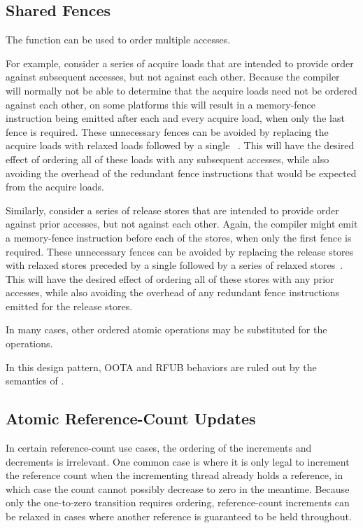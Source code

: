 \documentclass[10]{article}
\begin{document}
\subsection{Shared Fences}
\label{sec:Shared Fences}

The  function can be used to order multiple
accesses.

For example, consider a series of acquire loads that are intended to provide
order against subsequent accesses, but not against each other.
Because the compiler will normally not be able to determine that the
acquire loads need not be ordered against each other, on some platforms
this will result in a memory-fence instruction being emitted after each
and every acquire load, when only the last fence is required.
These unnecessary fences can be avoided by replacing the acquire
loads with relaxed loads followed by a single
~\cite[Section 4.1]{RaulSilvera2007WeakMemoryModel}.
This will have the desired effect of ordering all of these loads with any
subsequent accesses, while also avoiding the overhead of the redundant
fence instructions that would be expected from the acquire loads.

Similarly, consider a series of release stores that are intended to provide
order against prior accesses, but not against each other.
Again, the compiler might emit a memory-fence instruction before
each of the stores, when only the first fence is required.
These unnecessary fences can be avoided by replacing the release
stores with relaxed stores preceded by a single
 followed by
a series of relaxed stores~\cite[Section 4.2]{RaulSilvera2007WeakMemoryModel}.
This will have the desired effect of ordering all of these stores with any
prior accesses, while also avoiding the overhead of any redundant
fence instructions emitted for the release stores.

In many cases, other ordered atomic operations may be substituted for
the  operations.

In this design pattern, OOTA and RFUB behaviors are ruled out by the semantics
of .

\subsection{Atomic Reference-Count Updates}
\label{sec:Atomic Reference-Count Updates}

In certain reference-count use cases, the ordering of the increments and
decrements is irrelevant.
One common case is where it is only legal to increment the reference
count when the incrementing thread already holds a reference, in which
case the count cannot possibly decrease to zero in the meantime.
Because only the one-to-zero transition requires ordering, reference-count
increments can be relaxed in cases where another reference is guaranteed
to be held throughout.
\end{document}
